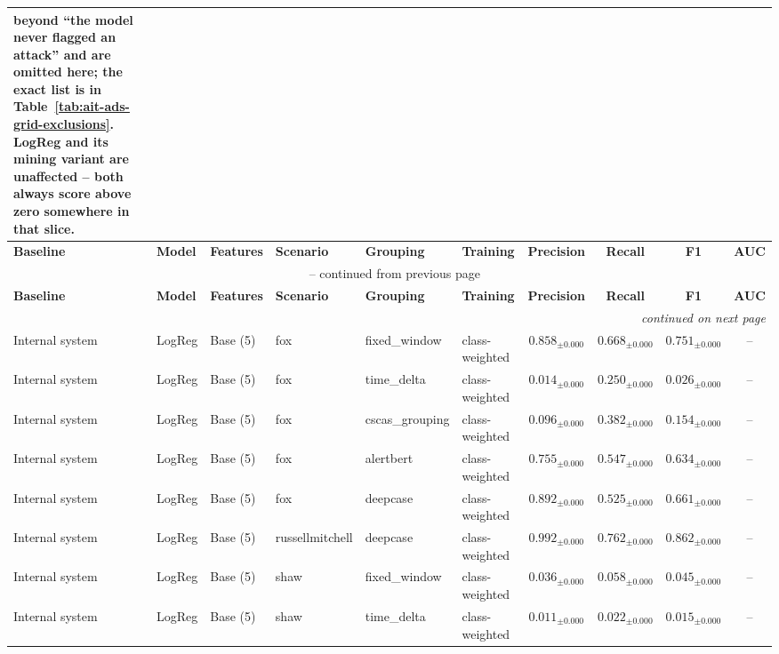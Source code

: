 \begin{longtable}{llllllcccc}
{beyond ``the model never flagged an attack'' and are omitted here; the exact
list is in Table~\ref{tab:ait-ads-grid-exclusions}. LogReg and its mining
variant are unaffected -- both always score above zero somewhere in that
slice.}
\label{tab:ait-ads-baseline-results-full} \\
\toprule
\textbf{Baseline} & \textbf{Model} & \textbf{Features} & \textbf{Scenario} & \textbf{Grouping} & \textbf{Training} & \textbf{Precision} & \textbf{Recall} & \textbf{F1} & \textbf{AUC} \\
\midrule
\endfirsthead
\multicolumn{10}{c}{\tablename\ \thetable{} -- continued from previous page} \\
\toprule
\textbf{Baseline} & \textbf{Model} & \textbf{Features} & \textbf{Scenario} & \textbf{Grouping} & \textbf{Training} & \textbf{Precision} & \textbf{Recall} & \textbf{F1} & \textbf{AUC} \\
\midrule
\endhead
\midrule \multicolumn{10}{r}{\textit{continued on next page}} \\
\endfoot
\bottomrule
\endlastfoot
Internal system & LogReg & Base (5) & fox & fixed\_window & class-weighted & $0.858_{\pm 0.000}$ & $0.668_{\pm 0.000}$ & $0.751_{\pm 0.000}$ & -- \\
\addlinespace
Internal system & LogReg & Base (5) & fox & time\_delta & class-weighted & $0.014_{\pm 0.000}$ & $0.250_{\pm 0.000}$ & $0.026_{\pm 0.000}$ & -- \\
\addlinespace
Internal system & LogReg & Base (5) & fox & cscas\_grouping & class-weighted & $0.096_{\pm 0.000}$ & $0.382_{\pm 0.000}$ & $0.154_{\pm 0.000}$ & -- \\
\addlinespace
Internal system & LogReg & Base (5) & fox & alertbert & class-weighted & $0.755_{\pm 0.000}$ & $0.547_{\pm 0.000}$ & $0.634_{\pm 0.000}$ & -- \\
\addlinespace
Internal system & LogReg & Base (5) & fox & deepcase & class-weighted & $0.892_{\pm 0.000}$ & $0.525_{\pm 0.000}$ & $0.661_{\pm 0.000}$ & -- \\
\addlinespace
Internal system & LogReg & Base (5) & russellmitchell & deepcase & class-weighted & $0.992_{\pm 0.000}$ & $0.762_{\pm 0.000}$ & $0.862_{\pm 0.000}$ & -- \\
\addlinespace
Internal system & LogReg & Base (5) & shaw & fixed\_window & class-weighted & $0.036_{\pm 0.000}$ & $0.058_{\pm 0.000}$ & $0.045_{\pm 0.000}$ & -- \\
\addlinespace
Internal system & LogReg & Base (5) & shaw & time\_delta & class-weighted & $0.011_{\pm 0.000}$ & $0.022_{\pm 0.000}$ & $0.015_{\pm 0.000}$ & -- \\

\end{longtable}
